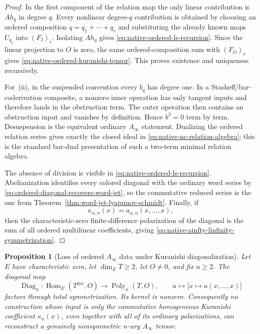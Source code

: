 \documentclass[11pt]{article}
\newtheorem{proposition}[theorem]{Proposition}
\theoremstyle{definition}
\begin{document}
\begin{proof}
In the first component of the relation map the only linear contribution is
$Ah_q$ in degree $q$.  Every nonlinear degree-$q$ contribution is obtained by
choosing an ordered composition $q=q_1+\cdots+q_r$ and substituting the
already known maps $U_{q_j}$ into $(F_I)_r$.  Isolating $Ah_q$ gives
\eqref{eq:native-ordered-ls-recursion}.  Since the linear projection to $O$
is zero, the same ordered-composition sum with $(F_O)_r$ gives
\eqref{eq:native-ordered-kuranishi-tensor}.  This proves existence and
uniqueness recursively.

For~(ii), in the suspended convention every $b_q$ has degree one.  In a
Stasheff/bar-coderivation composite, a nonzero inner operation has only
tangent inputs and therefore lands in the obstruction term.  The outer
operation then contains an obstruction input and vanishes by definition.
Hence $b^2=0$ term by term.  Desuspension is the equivalent ordinary
$A_\infty$ statement.  Dualizing the ordered relation series gives exactly
the closed ideal in \eqref{eq:native-nc-relation-algebra}; this is the
standard bar-dual presentation of such a two-term minimal relation algebra.

The absence of division is visible in
\eqref{eq:native-ordered-ls-recursion}.  Abelianization identifies every
colored diagonal with the ordinary word series by
\eqref{eq:ordered-diagonal-recovers-word-jet}, so the commutative reduced
series is the one from Theorem~\ref{thm:word-jet-lyapunov-schmidt}.
Finally, if
\[
 \kappa_{\alpha,n}(x)=a_{\alpha,n}(x,\ldots,x),
\]
then the characteristic-zero finite-difference polarization of the diagonal
is the sum of all ordered multilinear coefficients, giving
\eqref{eq:native-ainfty-linfinity-symmetrization}.
\end{proof}

\begin{proposition}[Loss of ordered $A_\infty$ data under Kuranishi diagonalization]\label{prop:kuranishi-diagonal-ainfty-no-go}
Let $E$ have characteristic zero, let $\dim_E T\ge2$, let $O\ne0$, and fix
$n\ge2$.  The diagonal map
\[
 \operatorname{Diag}_n:
 \operatorname{Hom}_E(T^{\otimes n},O)
 \longrightarrow
 \operatorname{Poly}_n(T,O),
 \qquad
 a\longmapsto\bigl[x\mapsto a(x,\ldots,x)\bigr]
\]
factors through total symmetrization.  Its kernel is nonzero.  Consequently
no construction whose input is only the commutative homogeneous Kuranishi
coefficient $\kappa_n(x)$, even together with all of its ordinary
polarizations, can reconstruct a genuinely nonsymmetric $n$-ary
$A_\infty$ tensor.
\end{proposition}
\end{document}
